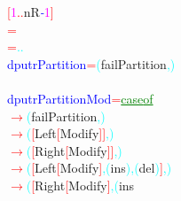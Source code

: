 {{\textcolor{red}{[}\textcolor{magenta}{1}\textcolor{red}{..}{\rm{}nR}\textcolor{blue}{{\it{}-}}\textcolor{magenta}{1}\textcolor{red}{]}\\\hsspace \hsspace \hsspace \hsspace \hsspace \hsspace \textcolor{red}{=}\\\hsspace \hsspace \hsspace \hsspace \hsspace \hsspace \hsspace \hsspace \textcolor{red}{=}\hsspace \textcolor{cyan}{.}\hsspace \textcolor{cyan}{.}\\\textcolor{blue}{dputrPartition}\hsspace \textcolor{red}{=}\hsspace \textcolor{cyan}{(}{\rm{}failPartition}\textcolor{cyan}{,}\textcolor{cyan}{)}\\\\\textcolor{blue}{dputrPartitionMod}\hsspace \textcolor{red}{=}\hsspace \textcolor{green}{\underline{case}}\hsspace \textcolor{green}{\underline{of}}\\\hsspace \hsspace \hsspace \hsspace \hsspace \textcolor{red}{\ensuremath{\rightarrow}}\hsspace \textcolor{cyan}{(}{\rm{}failPartition}\textcolor{cyan}{,}\textcolor{cyan}{)}\\\hsspace \hsspace \hsspace \hsspace \textcolor{red}{\ensuremath{\rightarrow}}\hsspace \textcolor{cyan}{(}\textcolor{red}{[}{\rm{}Left}\hsspace \hsspace \textcolor{red}{[}{\rm{}Modify}\textcolor{red}{]}\textcolor{red}{]}\textcolor{cyan}{,}\textcolor{cyan}{)}\\\hsspace \hsspace \hsspace \hsspace \textcolor{red}{\ensuremath{\rightarrow}}\hsspace \textcolor{cyan}{(}\textcolor{red}{[}{\rm{}Right}\hsspace \textcolor{red}{[}{\rm{}Modify}\textcolor{red}{]}\textcolor{red}{]}\textcolor{cyan}{,}\textcolor{cyan}{)}\\\hsspace \textcolor{red}{\ensuremath{\rightarrow}}\hsspace \textcolor{cyan}{(}\textcolor{red}{[}{\rm{}Left}\hsspace \hsspace \textcolor{red}{[}{\rm{}Modify}\textcolor{red}{]}\textcolor{cyan}{,}\hsspace \hsspace \textcolor{cyan}{(}{\rm{}ins}\textcolor{cyan}{)}\textcolor{cyan}{,}\hsspace \hsspace \textcolor{cyan}{(}{\rm{}del}\textcolor{cyan}{)}\textcolor{red}{]}\textcolor{cyan}{,}\textcolor{cyan}{)}\\\hsspace \textcolor{red}{\ensuremath{\rightarrow}}\hsspace \textcolor{cyan}{(}\textcolor{red}{[}{\rm{}Right}\hsspace \textcolor{red}{[}{\rm{}Modify}\textcolor{red}{]}\textcolor{cyan}{,}\hsspace \textcolor{cyan}{(}{\rm{}ins}\hsspace }}
